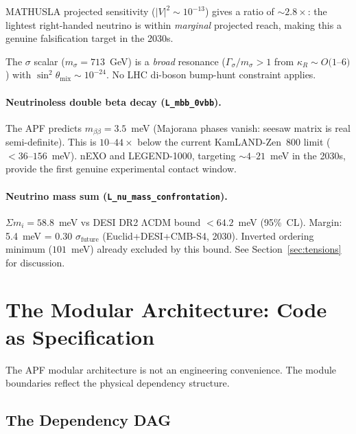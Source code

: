 \documentclass[11pt]{article}
\begin{document}
MATHUSLA projected sensitivity ($|V|^2 \sim 10^{-13}$) gives a ratio of $\sim 2.8\times$: the lightest right-handed neutrino is within \emph{marginal} projected reach, making this a genuine falsification target in the 2030s.

The $\sigma$ scalar ($m_\sigma = 713$~GeV) is a \emph{broad} resonance ($\Gamma_\sigma/m_\sigma > 1$ from $\kappa_R \sim O(1$--$6)$) with $\sin^2\!\theta_{\mathrm{mix}} \sim 10^{-24}$.  No LHC di-boson bump-hunt constraint applies.

\paragraph{Neutrinoless double beta decay (\texttt{L\_mbb\_0vbb}).}
The APF predicts $m_{\beta\beta} = 3.5$~meV (Majorana phases vanish: seesaw matrix is real semi-definite).  This is $10$--$44\times$ below the current KamLAND-Zen~800 limit ($<36$--$156$~meV).  nEXO and LEGEND-1000, targeting $\sim 4$--$21$~meV in the 2030s, provide the first genuine experimental contact window.

\paragraph{Neutrino mass sum (\texttt{L\_nu\_mass\_confrontation}).}
$\Sigma m_i = 58.8$~meV vs DESI DR2 ΛCDM bound $< 64.2$~meV (95\%~CL).  Margin: 5.4~meV = 0.30 $\sigma_{\mathrm{future}}$ (Euclid+DESI+CMB-S4, 2030).  Inverted ordering minimum ($101$~meV) already excluded by this bound.  See Section~\ref{sec:tensions} for discussion.


\section{The Modular Architecture: Code as Specification}

The APF modular architecture is not an engineering convenience.  The module boundaries reflect the physical dependency structure.

\subsection{The Dependency DAG}
\end{document}
